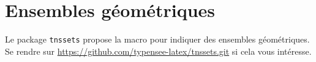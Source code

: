 \documentclass[12pt,a4paper]{article}
\begin{document}
\section{Ensembles géométriques}

Le package \verb+tnssets+ propose la macro  pour indiquer des ensembles géométriques.
Se rendre sur \url{https://github.com/typensee-latex/tnssets.git} si cela vous intéresse. 
\end{document}
